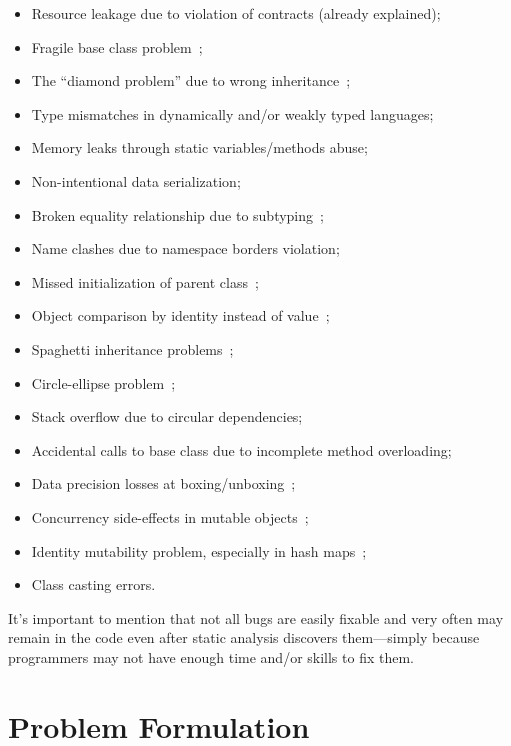 \documentclass[12pt]{article}
\begin{document}
\begin{itemize}
\item Resource leakage due to violation of contracts (already explained);
\item Fragile base class problem~\citep{mikhajlov1998study};
\item The ``diamond problem'' due to wrong inheritance~\citep{roebuck2011};
\item Type mismatches in dynamically and/or weakly typed languages;
\item Memory leaks through static variables/methods abuse;
\item Non-intentional data serialization;
\item Broken equality relationship due to subtyping~\citep{sarcar2020};
\item Name clashes due to namespace borders violation;
\item Missed initialization of parent class~\citep{roebuck2011};
\item Object comparison by identity instead of value~\citep{bloch2016effective};
\item Spaghetti inheritance problems~\citep{geetha08};
\item Circle-ellipse problem~\citep{majorinc1998elipse};
\item Stack overflow due to circular dependencies;
\item Accidental calls to base class due to incomplete method overloading;
\item Data precision losses at boxing/unboxing~\citep{bloch2016effective};
\item Concurrency side-effects in mutable objects~\citep{goetz2006java};
\item Identity mutability problem, especially in hash maps~\citep{goetz2006java};
\item Class casting errors.
\end{itemize}

It's important to mention that not all bugs are easily fixable and
very often may remain in the code even after static analysis discovers
them---simply because programmers may not have enough time and/or skills
to fix them.

\section{Problem Formulation}
\end{document}
